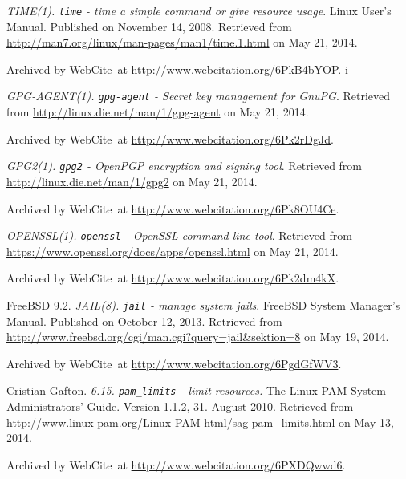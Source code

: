 \begin{thebibliography}{9}

\emph{TIME(1). \texttt{time} - time a simple command or give resource usage}.
Linux User's Manual. Published on November 14, 2008. Retrieved from
\url{http://man7.org/linux/man-pages/man1/time.1.html} on May 21, 2014.

Archived by WebCite\textsuperscript{\textregistered}\ at
\url{http://www.webcitation.org/6PkB4bYOP}.
i

\emph{GPG-AGENT(1). \texttt{gpg-agent} - Secret key management for GnuPG}.
Retrieved from \url{http://linux.die.net/man/1/gpg-agent} on May 21, 2014.

Archived by WebCite\textsuperscript{\textregistered}\ at
\url{http://www.webcitation.org/6Pk2rDgJd}.


\emph{GPG2(1). \texttt{gpg2} - OpenPGP encryption and signing tool}. Retrieved
from \url{http://linux.die.net/man/1/gpg2} on May 21, 2014.

Archived by WebCite\textsuperscript{\textregistered}\ at
\url{http://www.webcitation.org/6Pk8OU4Ce}.


\emph{OPENSSL(1). \texttt{openssl} - OpenSSL command line tool}. Retrieved from
\url{https://www.openssl.org/docs/apps/openssl.html} on May 21, 2014.

Archived by WebCite\textsuperscript{\textregistered}\ at
\url{http://www.webcitation.org/6Pk2dm4kX}.


FreeBSD 9.2. \emph{JAIL(8). \texttt{jail} - manage system jails}. FreeBSD
System Manager's Manual. Published on October 12, 2013. Retrieved from
\url{http://www.freebsd.org/cgi/man.cgi?query=jail\&sektion=8} on May 19, 2014.

Archived by WebCite\textsuperscript{\textregistered}\ at
\url{http://www.webcitation.org/6PgdGfWV3}.


Cristian Gafton. \emph{6.15. \texttt{pam\_limits} - limit resources.} The
Linux-PAM System Administrators' Guide. Version 1.1.2, 31. August 2010.
Retrieved from
\url{http://www.linux-pam.org/Linux-PAM-html/sag-pam_limits.html} on May 13,
2014.

Archived by WebCite\textsuperscript{\textregistered}\ at
\url{http://www.webcitation.org/6PXDQwwd6}.


\end{thebibliography}
